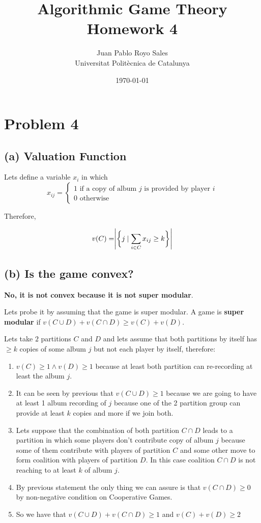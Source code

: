 \documentclass[12pt, a4paper]{article}
\title{%
  Algorithmic Game Theory \\
  Homework 4
}
\author{%
  Juan Pablo Royo Sales\\
  \small{Universitat Politècnica de Catalunya}
}
\date\today
\begin{document}
\maketitle

\section{Problem 4}
\subsection{(a) Valuation Function}
Lets define a variable $x_i$ in which 
\[
x_{ij} = 
\begin{cases}
  1 \text{ if a copy of album } j \text{ is provided by player } i\\
  0 \text{ otherwise } 
\end{cases}
\]

Therefore, 

\begin{equation*}
  v(C) = \Biggr|\biggr\{j \mid \sum_{i \in C} x_{ij} \geq k \biggl\}\Biggl|\\
\end{equation*}

\subsection{(b) Is the game convex?}
\textbf{No, it is not convex because it is not super modular}.

Lets probe it by assuming that the game is super modular.
A game is \textbf{super modular} if $v(C \cup D) + v(C \cap D) \geq v(C) + v(D)$.

Lets take $2$ partitions $C$ and $D$ and lets assume that both partitions by itself has $ \geq k$ copies of some album $j$ but not each player by itself, therefore:

\begin{enumerate}
  \item $v(C) \geq 1 \land v(D) \geq 1$ because at least both partition can re-recording at least the album $j$.
  \item It can be seen by previous that $v(C \cup D) \geq 1$ because we are going to have at least 1 album recording of $j$ because one of the 2 partition group can provide at least $k$ copies and more if we join both.
  \item Lets suppose that the combination of both partition $C \cap D$ leads to a partition in which some players don't contribute copy of album $j$ because some of them contribute with players of partition $C$ and some other move to form coalition with players of partition $D$. In this case coalition $C \cap D$ is not reaching to at least $k$ of album $j$.
  \item By previous statement the only thing we can assure is that $v(C \cap D) \geq 0$ by non-negative condition on Cooperative Games.
  \item So we have that $v(C \cup D) + v(C \cap D) \geq 1$ and $v(C) + v(D) \geq 2$
\end{enumerate}
\end{document}
